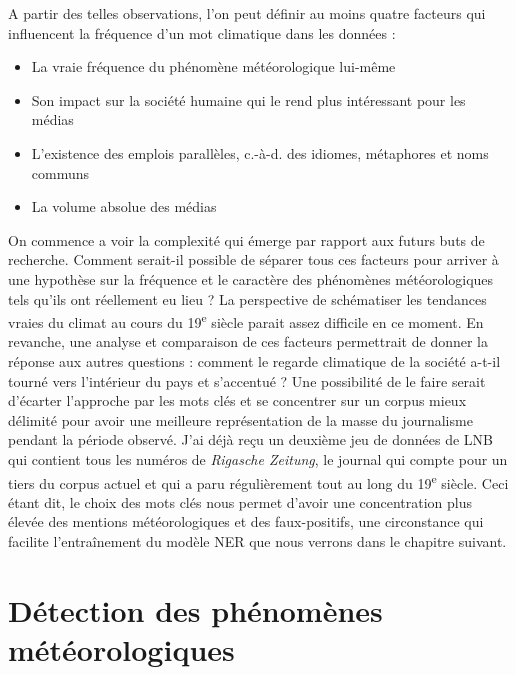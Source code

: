 \documentclass[a4paper,twoside,12pt]{article}
\begin{document}
A partir des telles observations, l'on peut définir au moins quatre facteurs qui influencent la fréquence d'un mot \og climatique \fg{} dans les données :
\vspace{1ex}
\begin{itemize}[label=$\bullet$]
    \item La vraie fréquence du phénomène météorologique lui-même
    \item Son impact sur la société humaine qui le rend plus intéressant pour les médias
    \item L'existence des emplois parallèles, c.-à-d. des idiomes, métaphores et noms communs
    \item La volume absolue des médias
\end{itemize}
\vspace{2ex}

On commence a voir la complexité qui émerge par rapport aux futurs buts de recherche. Comment serait-il possible de séparer tous ces facteurs pour arriver à une hypothèse sur la fréquence et le caractère des phénomènes météorologiques tels qu'ils ont réellement eu lieu ? La perspective de schématiser les tendances vraies du climat au cours du 19\textsuperscript{e} siècle parait assez difficile en ce moment. En revanche, une analyse et comparaison de ces facteurs permettrait de donner la réponse aux autres questions : comment le regarde \og climatique \fg{} de la société a-t-il tourné vers l'intérieur du pays et s'accentué ? Une possibilité de le faire serait d'écarter l'approche par les mots clés et se concentrer sur un corpus mieux délimité pour avoir une meilleure représentation de la masse du journalisme pendant la période observé. J'ai déjà reçu un deuxième jeu de données de LNB qui contient tous les numéros de \textit{Rigasche Zeitung}, le journal qui compte pour un tiers du corpus actuel et qui a paru régulièrement tout au long du 19\textsuperscript{e} siècle. Ceci étant dit, le choix des mots clés nous permet d'avoir une concentration plus élevée des mentions météorologiques et des faux-positifs, une circonstance qui facilite l'entraînement du modèle NER que nous verrons dans le chapitre suivant.

\clearpage












\section{Détection des phénomènes météorologiques}
\end{document}
